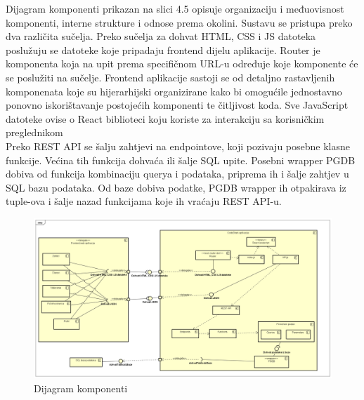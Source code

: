 		Dijagram komponenti prikazan na slici 4.5 opisuje organizaciju i međuovisnost komponenti, interne strukture i odnose prema okolini. Sustavu se pristupa preko dva različita sučelja. Preko sučelja za dohvat HTML, CSS i JS datoteka poslužuju se datoteke koje pripadaju frontend dijelu aplikacije. Router je komponenta koja na upit prema specifičnom URL-u određuje koje komponente će se poslužiti na sučelje. Frontend aplikacije sastoji se od detaljno rastavljenih komponenata koje su hijerarhijski organizirane kako bi omogućile jednostavno ponovno iskorištavanje postojećih komponenti te čitljivost koda. Sve JavaScript datoteke ovise o React biblioteci koju koriste za interakciju sa korisničkim preglednikom \\
		
		Preko REST API se šalju zahtjevi na endpointove, koji pozivaju posebne klasne funkcije.  Većina tih funkcija dohvaća ili šalje SQL upite. Posebni wrapper PGDB dobiva od funkcija kombinaciju querya i podataka, priprema ih i šalje zahtjev u SQL bazu podataka. Od baze dobiva podatke, PGDB wrapper ih otpakirava iz tuple-ova i šalje nazad funkcijama koje ih vraćaju REST API-u.
		
			\begin{figure}[H]
				\includegraphics[width=\textwidth]{slike/DijagramKomponenti.png} %
				\caption{Dijagram komponenti}
				\label{fig:DijagramKomponenti} %
			\end{figure}